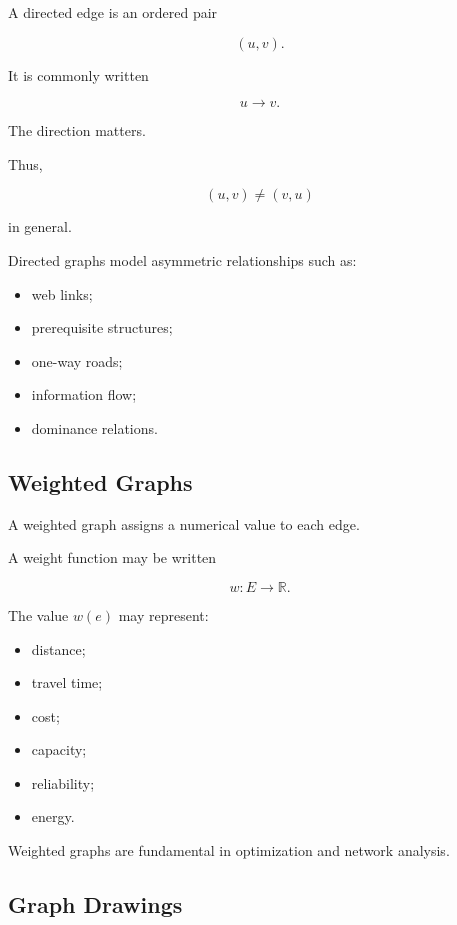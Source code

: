 A directed edge is an ordered pair

\[
(u,v).
\]

It is commonly written

\[
\boxed{
u\longrightarrow v.
}
\]

The direction matters.

Thus,

\[
(u,v)\neq(v,u)
\]

in general.

Directed graphs model asymmetric relationships such as:

\begin{itemize}
    \item web links;
    \item prerequisite structures;
    \item one-way roads;
    \item information flow;
    \item dominance relations.
\end{itemize}

\subsection{Weighted Graphs}
\label{subsec:weighted-graphs}

A weighted graph assigns a numerical value to each edge.

A weight function may be written

\[
\boxed{
w:E\to\mathbb{R}.
}
\]

The value \(w(e)\) may represent:

\begin{itemize}
    \item distance;
    \item travel time;
    \item cost;
    \item capacity;
    \item reliability;
    \item energy.
\end{itemize}

Weighted graphs are fundamental in optimization and network analysis.

\subsection{Graph Drawings}
\label{subsec:graph-drawings}


